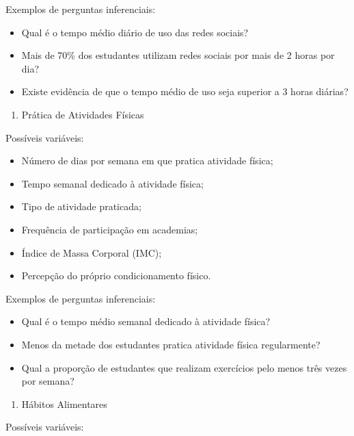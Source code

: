 \documentclass[
  letterpaper,
  DIV=11,
  numbers=noendperiod]{scrreprt}
\providecommand{\tightlist}{%
  \setlength{\itemsep}{0pt}\setlength{\parskip}{0pt}}\usepackage{longtable,booktabs,array}
\begin{document}
Exemplos de perguntas inferenciais:

\begin{itemize}
\tightlist
\item
  Qual é o tempo médio diário de uso das redes sociais?
\item
  Mais de 70\% dos estudantes utilizam redes sociais por mais de 2 horas
  por dia?
\item
  Existe evidência de que o tempo médio de uso seja superior a 3 horas
  diárias?
\end{itemize}

\begin{enumerate}
\def\labelenumi{\arabic{enumi}.}
\setcounter{enumi}{3}
\tightlist
\item
  Prática de Atividades Físicas
\end{enumerate}

Possíveis variáveis:

\begin{itemize}
\tightlist
\item
  Número de dias por semana em que pratica atividade física;
\item
  Tempo semanal dedicado à atividade física;
\item
  Tipo de atividade praticada;
\item
  Frequência de participação em academias;
\item
  Índice de Massa Corporal (IMC);
\item
  Percepção do próprio condicionamento físico.
\end{itemize}

Exemplos de perguntas inferenciais:

\begin{itemize}
\tightlist
\item
  Qual é o tempo médio semanal dedicado à atividade física?
\item
  Menos da metade dos estudantes pratica atividade física regularmente?
\item
  Qual a proporção de estudantes que realizam exercícios pelo menos três
  vezes por semana?
\end{itemize}

\begin{enumerate}
\def\labelenumi{\arabic{enumi}.}
\setcounter{enumi}{4}
\tightlist
\item
  Hábitos Alimentares
\end{enumerate}

Possíveis variáveis:
\end{document}
